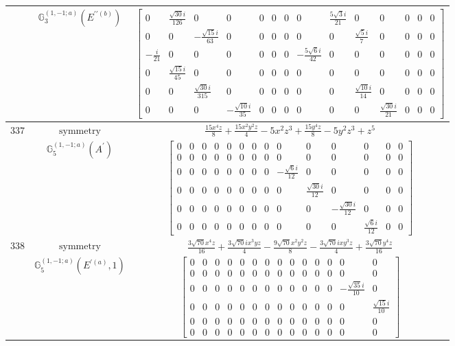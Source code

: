 \documentclass[fleqn,8pt,landscape]{jsarticle}
\begin{document}
\begin{longtable}{ccc}
$  $ & $ \mathbb{G}_{3}^{(1,-1;a)}(E^{\prime\prime(b)}) $ & $ \begin{bmatrix} 0 & \frac{\sqrt{30} i}{126} & 0 & 0 & 0 & 0 & 0 & 0 & \frac{5 \sqrt{3} i}{21} & 0 & 0 & 0 & 0 & 0 \\ 0 & 0 & - \frac{\sqrt{15} i}{63} & 0 & 0 & 0 & 0 & 0 & 0 & \frac{\sqrt{5} i}{7} & 0 & 0 & 0 & 0 \\ - \frac{i}{21} & 0 & 0 & 0 & 0 & 0 & 0 & - \frac{5 \sqrt{6} i}{42} & 0 & 0 & 0 & 0 & 0 & 0 \\ 0 & \frac{\sqrt{15} i}{45} & 0 & 0 & 0 & 0 & 0 & 0 & 0 & 0 & 0 & 0 & 0 & 0 \\ 0 & 0 & \frac{\sqrt{30} i}{315} & 0 & 0 & 0 & 0 & 0 & 0 & \frac{\sqrt{10} i}{14} & 0 & 0 & 0 & 0 \\ 0 & 0 & 0 & - \frac{\sqrt{10} i}{35} & 0 & 0 & 0 & 0 & 0 & 0 & \frac{\sqrt{30} i}{21} & 0 & 0 & 0 \end{bmatrix} $ \\ \hline
$ 337 $ & $ \text{symmetry} $ & $ \frac{15 x^{4} z}{8} + \frac{15 x^{2} y^{2} z}{4} - 5 x^{2} z^{3} + \frac{15 y^{4} z}{8} - 5 y^{2} z^{3} + z^{5} $ \\
$  $ & $ \mathbb{G}_{5}^{(1,-1;a)}(A^{\prime}) $ & $ \begin{bmatrix} 0 & 0 & 0 & 0 & 0 & 0 & 0 & 0 & 0 & 0 & 0 & 0 & 0 & 0 \\ 0 & 0 & 0 & 0 & 0 & 0 & 0 & 0 & 0 & 0 & 0 & 0 & 0 & 0 \\ 0 & 0 & 0 & 0 & 0 & 0 & 0 & 0 & - \frac{\sqrt{6} i}{12} & 0 & 0 & 0 & 0 & 0 \\ 0 & 0 & 0 & 0 & 0 & 0 & 0 & 0 & 0 & \frac{\sqrt{30} i}{12} & 0 & 0 & 0 & 0 \\ 0 & 0 & 0 & 0 & 0 & 0 & 0 & 0 & 0 & 0 & - \frac{\sqrt{30} i}{12} & 0 & 0 & 0 \\ 0 & 0 & 0 & 0 & 0 & 0 & 0 & 0 & 0 & 0 & 0 & \frac{\sqrt{6} i}{12} & 0 & 0 \end{bmatrix} $ \\ \hline
$ 338 $ & $ \text{symmetry} $ & $ \frac{3 \sqrt{70} x^{4} z}{16} + \frac{3 \sqrt{70} i x^{3} y z}{4} - \frac{9 \sqrt{70} x^{2} y^{2} z}{8} - \frac{3 \sqrt{70} i x y^{3} z}{4} + \frac{3 \sqrt{70} y^{4} z}{16} $ \\
$  $ & $ \mathbb{G}_{5}^{(1,-1;a)}(E^{\prime(a)},1) $ & $ \begin{bmatrix} 0 & 0 & 0 & 0 & 0 & 0 & 0 & 0 & 0 & 0 & 0 & 0 & 0 & 0 \\ 0 & 0 & 0 & 0 & 0 & 0 & 0 & 0 & 0 & 0 & 0 & 0 & 0 & 0 \\ 0 & 0 & 0 & 0 & 0 & 0 & 0 & 0 & 0 & 0 & 0 & 0 & - \frac{\sqrt{35} i}{10} & 0 \\ 0 & 0 & 0 & 0 & 0 & 0 & 0 & 0 & 0 & 0 & 0 & 0 & 0 & \frac{\sqrt{15} i}{10} \\ 0 & 0 & 0 & 0 & 0 & 0 & 0 & 0 & 0 & 0 & 0 & 0 & 0 & 0 \\ 0 & 0 & 0 & 0 & 0 & 0 & 0 & 0 & 0 & 0 & 0 & 0 & 0 & 0 \end{bmatrix} $ \\ \hline

\end{longtable}
\end{document}
